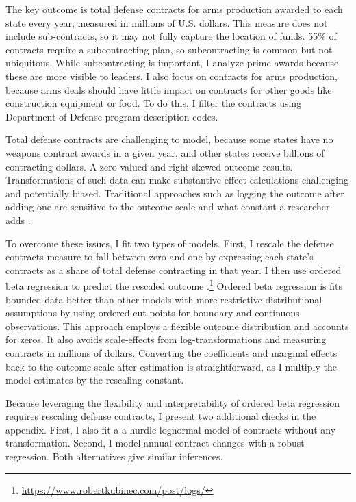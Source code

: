 \documentclass[12pt]{article}
\begin{document}
The key outcome is total defense contracts for arms production awarded to each state every year, measured in millions of U.S. dollars.
This measure does not include sub-contracts, so it may not fully capture the location of funds. 
55\% of contracts require a subcontracting plan, so subcontracting is common but not ubiquitous.  
While subcontracting is important, I analyze prime awards because these are more visible to leaders. 
I also focus on contracts for arms production, because arms deals should have little impact on contracts for other goods like construction equipment or food.
To do this, I filter the contracts using Department of Defense program description codes. 


Total defense contracts are challenging to model, because some states have no weapons contract awards in a given year, and other states receive billions of contracting dollars. 
A zero-valued and right-skewed outcome results. 
Transformations of such data can make substantive effect calculations challenging and potentially biased. 
Traditional approaches such as logging the outcome after adding one are sensitive to the outcome scale and what constant a researcher adds \citep{ChenRoth2022, MullahyNorton2022}. 


To overcome these issues, I fit two types of models.
First, I rescale the defense contracts measure to fall between zero and one by expressing each state's contracts as a share of total defense contracting in that year.
I then use ordered beta regression to predict the rescaled outcome \citep{Kubinec2022}.\footnote{\url{https://www.robertkubinec.com/post/logs/}} 
Ordered beta regression is fits bounded data better than other models with more restrictive distributional assumptions by using ordered cut points for boundary and continuous observations. 
This approach employs a flexible outcome distribution and accounts for zeros.
It also avoids scale-effects from log-transformations and measuring contracts in millions of dollars. 
Converting the coefficients and marginal effects back to the outcome scale after estimation is straightforward, as I multiply the model estimates by the rescaling constant.


Because leveraging the flexibility and interpretability of ordered beta regression requires rescaling defense contracts, I present two additional checks in the appendix. 
First, I also fit a a hurdle lognormal model of contracts without any transformation.
Second, I model annual contract changes with a robust regression. 
Both alternatives give similar inferences.
\end{document}
